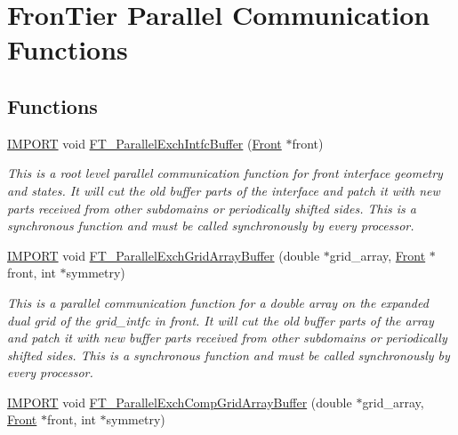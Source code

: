 \hypertarget{group___p_a_r_a_l_l_e_l}{}\section{Fron\+Tier Parallel Communication Functions}
\label{group___p_a_r_a_l_l_e_l}
\subsection*{Functions}
\begin{DoxyCompactItemize}
\item 
\hyperlink{cdecs_8h_a773175d74e73776d69c3e538f17de1ee}{I\+M\+P\+O\+RT} void \hyperlink{group___p_a_r_a_l_l_e_l_gac19fe575c3db8061a68071d9c0f36196}{F\+T\+\_\+\+Parallel\+Exch\+Intfc\+Buffer} (\hyperlink{fdecs_8h_ac32202b798f848095c489cfd04c4ca5f}{Front} $\ast$front)
\begin{DoxyCompactList}\small\item\em This is a root level parallel communication function for front interface geometry and states. It will cut the old buffer parts of the interface and patch it with new parts received from other subdomains or periodically shifted sides. This is a synchronous function and must be called synchronously by every processor. \end{DoxyCompactList}\item 
\hyperlink{cdecs_8h_a773175d74e73776d69c3e538f17de1ee}{I\+M\+P\+O\+RT} void \hyperlink{group___p_a_r_a_l_l_e_l_gaa042f0a83036a09217d911c2c4b9f33b}{F\+T\+\_\+\+Parallel\+Exch\+Grid\+Array\+Buffer} (double $\ast$grid\+\_\+array, \hyperlink{fdecs_8h_ac32202b798f848095c489cfd04c4ca5f}{Front} $\ast$front, int $\ast$symmetry)
\begin{DoxyCompactList}\small\item\em This is a parallel communication function for a double array on the expanded dual grid of the grid\+\_\+intfc in front. It will cut the old buffer parts of the array and patch it with new buffer parts received from other subdomains or periodically shifted sides. This is a synchronous function and must be called synchronously by every processor. \end{DoxyCompactList}\item 
\hyperlink{cdecs_8h_a773175d74e73776d69c3e538f17de1ee}{I\+M\+P\+O\+RT} void \hyperlink{group___p_a_r_a_l_l_e_l_ga59349c20bb1702967ded6600787ce63e}{F\+T\+\_\+\+Parallel\+Exch\+Comp\+Grid\+Array\+Buffer} (double $\ast$grid\+\_\+array, \hyperlink{fdecs_8h_ac32202b798f848095c489cfd04c4ca5f}{Front} $\ast$front, int $\ast$symmetry)

\end{DoxyCompactItemize}
